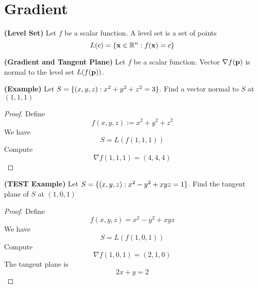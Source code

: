 \documentclass{report}
\begin{document}
\section{Gradient}
\begin{definition}
\label{4.5.1}
\textbf{(Level Set)} Let $f$ be a scalar function. A level set is a set of points
\begin{equation}
L(c)=\{ \textbf{x}\in\mathbb{R}^n: f(\textbf{x})=c \}
\end{equation}
\end{definition}
\begin{theorem}
\label{4.5.2}
\textbf{(Gradient and Tangent Plane)} Let $f$ be a scalar function. Vector $\nabla f(\textbf{p})$ is normal to the level set $L(f(\textbf{p}))$. 
\end{theorem}
\begin{theorem}
\label{4.5.3}
\textbf{(Example)} Let $S=\{ (x,y,z):x^2+y^2+z^2=3 \}$. Find a vector normal to $S$ at  $(1,1,1)$
\end{theorem}
\begin{proof}
Define
\begin{equation}
f(x,y,z):=x^2+y^2+z^2 
\end{equation}
We have
\begin{equation}
S=L(f(1,1,1))
\end{equation}
Compute
\begin{equation}
\nabla f(1,1,1)=(4,4,4)
\end{equation}
\end{proof}
\begin{theorem}
\label{4.5.4}
\textbf{(TEST Example)} Let $S=\{ (x,y,z):x^2-y^2+xyz=1 \}$. Find the tangent plane of $S$ at $(1,0,1)$ 
\end{theorem}
\begin{proof}
Define
\begin{equation}
f(x,y,z)=x^2-y^2+xyz
\end{equation}
We have
\begin{equation}
S=L(f(1,0,1))
\end{equation}
Compute
\begin{equation}
\nabla f(1,0,1)=(2,1,0)
\end{equation}
The tangent plane is 
\begin{equation}
2x+y=2
\end{equation}
\end{proof}
\end{document}
